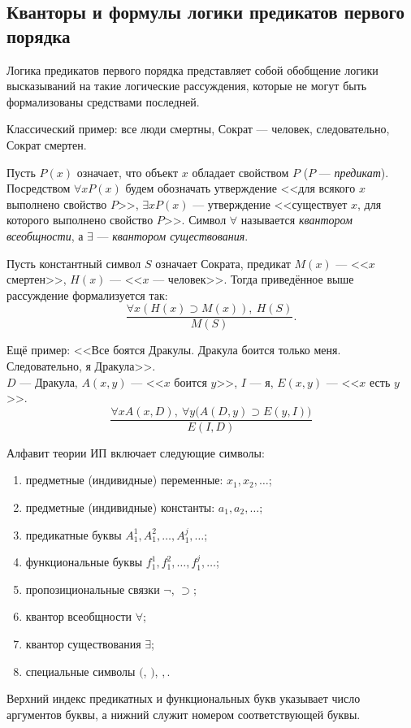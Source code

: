 \subsection{Кванторы и формулы логики предикатов первого порядка}
Логика предикатов первого порядка представляет собой обобщение логики высказываний на такие логические рассуждения, которые не могут быть формализованы средствами последней.

Классический пример: все люди смертны, Сократ --- человек, следовательно, Сократ смертен.

Пусть $P(x)$ означает, что объект $x$ обладает свойством $P$ ($P$ --- \textit{предикат}). Посредством $\forall xP(x)$ будем обозначать утверждение <<для всякого $x$ выполнено свойство $P$>>, $\exists xP(x)$ --- утверждение <<существует $x$, для которого выполнено свойство $P$>>. Символ $\forall$ называется \textit{квантором всеобщности}, а $\exists$ --- \textit{квантором существования}.

Пусть константный символ $S$ означает Сократа, предикат $M(x)$ --- <<$x$ смертен>>, $H(x)$ --- <<$x$ --- человек>>. Тогда приведённое выше рассуждение формализуется так:
\[
    \frac{\forall x(H(x) \supset M(x)),\ H(S)}{M(S)}.
\]


Ещё пример: <<Все боятся Дракулы. Дракула боится только меня. Следовательно, я Дракула>>. \\
$D$ --- Дракула, $A(x, y)$ --- <<$x$ боится $y$>>, $I$ --- я, $E(x, y)$ --- <<$x$ есть $y$>>.
\[
    \frac{\forall xA(x, D),\ \forall y\big(A(D, y) \supset E(y, I)\big)}{E(I, D)}
\]

Алфавит теории ИП включает следующие символы:
\begin{enumerate}
    \item предметные (индивидные) переменные: $x_1, x_2, \dots$;
    \item предметные (индивидные) константы: $a_1, a_2, \dots$;
    \item предикатные буквы $A_1^1, A_1^2, \dots, A_1^j, \dots$;
    \item функциональные буквы $f_1^1, f_1^2, \dots, f_1^j, \dots$;
    \item пропозициональные связки $\neg$, $\supset$;
    \item квантор всеобщности $\forall$;
    \item квантор существования $\exists$;
    \item специальные символы $($, $)$, $,$.
\end{enumerate}
Верхний индекс предикатных и функциональных букв указывает число аргументов буквы, а нижний служит номером соответствующей буквы.

